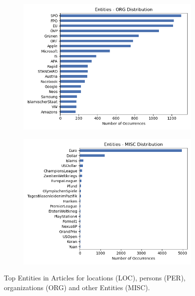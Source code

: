 \documentclass[acmsmall]{acmart}
\begin{document}
\begin{figure}[h!]
\begin{subfigure}[b]{0.475\textwidth}
            \includegraphics[width=\textwidth]{assets/Entities_ORG_Distribution.png}
        \end{subfigure}
        \begin{subfigure}[b]{0.475\textwidth}   
            \centering 
            \includegraphics[width=\textwidth]{assets/Entities_MISC_Distribution.png}
        \end{subfigure}
         \caption{Top Entities in Articles for locations (LOC), persons (PER), organizations (ORG) and other Entities (MISC).}
         \label{fig:named_entities}
\end{figure}
\end{document}
